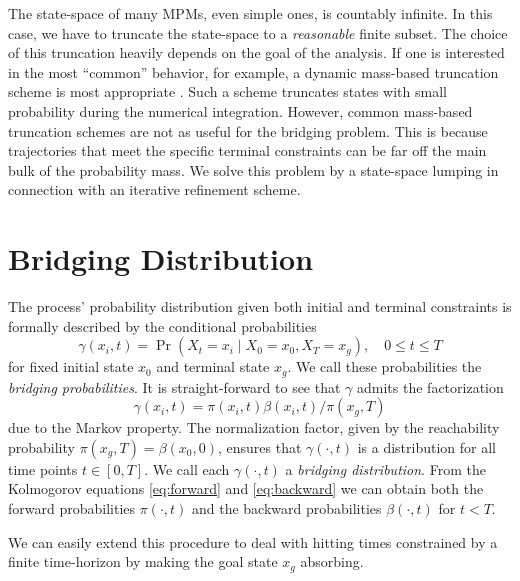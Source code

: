 The state-space of many \acp{MPM}, even simple ones, is countably infinite.
In this case, we have to truncate the state-space to a \emph{reasonable}
finite subset.
The choice of this truncation heavily depends on the goal of the
analysis.
If one is interested in the most ``common'' behavior, for example,
a dynamic mass-based truncation scheme is most appropriate \cite{mikeev2019approximate}.
Such a scheme truncates states with small probability during the numerical integration.
However, common mass-based truncation schemes are not as useful for the
bridging problem. This is because trajectories that meet
the specific terminal constraints can be far off the main bulk of the
probability mass.
We solve this problem by a state-space lumping in connection with an
iterative refinement scheme.


\section{Bridging Distribution}
The process' probability distribution given both initial and terminal constraints is formally described  by
the conditional probabilities
\begin{equation}\label{eq:bridge_dist}
    \gamma(x_i, t) = \Pr(X_t = x_i \mid X_0 = x_0, X_T = x_g), \quad 0\leq t\leq T
\end{equation}
for fixed initial state $x_0$ and terminal state $x_g$.
We call these probabilities the \emph{bridging probabilities}.
It is straight-forward to see that      $\gamma$ admits the
factorization
\begin{equation}\label{eq:bridge_fact}
    \gamma(x_i, t) = \pi(x_i, t)\beta(x_i, t)/\pi(x_g, T)
\end{equation}
due to the Markov property.
The normalization factor, given by the reachability probability $\pi(x_g, T)=\beta(x_0, 0)$, ensures that $\gamma(\cdot, t)$ is 
a distribution for all time points $t\in[0,T]$.
We call each $\gamma(\cdot, t)$ a   \emph{bridging distribution}.
From the Kolmogorov equations \eqref{eq:forward} and \eqref{eq:backward}
we can obtain both the forward probabilities $\pi(\cdot, t)$ and the backward probabilities
$\beta(\cdot, t)$ for $t< T$.


We can easily extend this procedure to deal with hitting times
constrained by a finite time-horizon by making the goal state $x_g$ absorbing.


